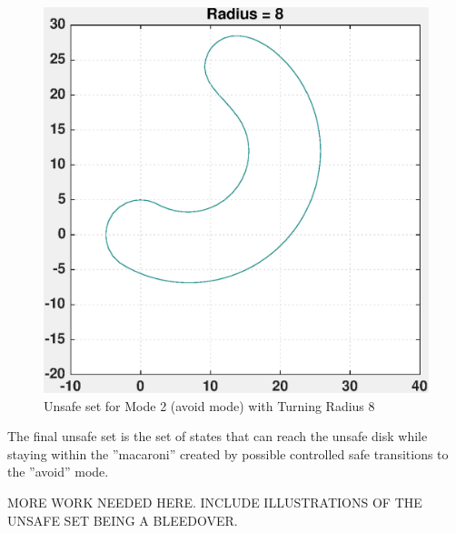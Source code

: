 \documentclass[a4paper]{article}
\begin{document}
\begin{figure}[!ht]
\begin{minipage}[b]{0.4\textwidth}
    \includegraphics[width=1.0\textwidth]{HyAvoid8.eps}
    \caption{Unsafe set for Mode 2 (avoid mode) with Turning Radius 8}
  \end{minipage}
\end{figure}

The final unsafe set is the set of states that can reach the unsafe disk while staying within the ''macaroni'' created by possible controlled safe transitions to the ''avoid'' mode.

MORE WORK NEEDED HERE. INCLUDE ILLUSTRATIONS OF THE UNSAFE SET BEING A BLEEDOVER.
\end{document}
